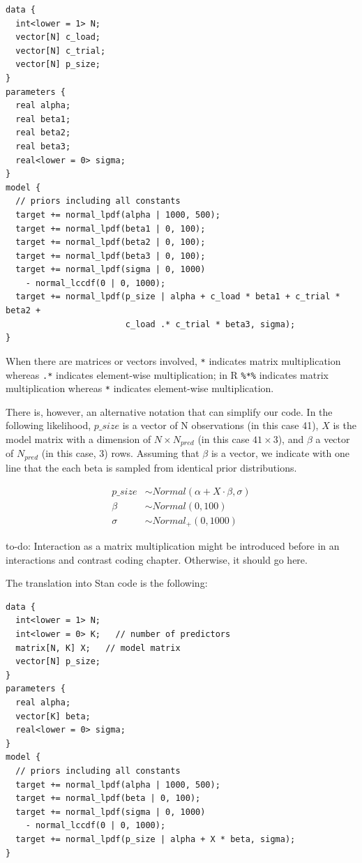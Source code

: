 \documentclass[12pt,]{krantz}
\makeatletter
\newenvironment{kframe}{%
\medskip{}
\setlength{\fboxsep}{.8em}
 \def\at@end@of@kframe{}%
 \ifinner\ifhmode%
  \def\at@end@of@kframe{\end{minipage}}%
  \begin{minipage}{\columnwidth}%
 \fi\fi%
 \def\FrameCommand##1{\hskip\@totalleftmargin \hskip-\fboxsep
 \colorbox{shadecolor}{##1}\hskip-\fboxsep
     \hskip-\linewidth \hskip-\@totalleftmargin \hskip\columnwidth}%
 \MakeFramed {\advance\hsize-\width
   \@totalleftmargin\z@ \linewidth\hsize
   \@setminipage}}%
 {\par\unskip\endMakeFramed%
 \at@end@of@kframe}
\newenvironment{rmdblock}[1]
  {
  \begin{itemize}
  \renewcommand{\labelitemi}{
    \raisebox{-.7\height}[0pt][0pt]{
      {\setkeys{Gin}{width=3em,keepaspectratio}\texttt{[image: images/\#1]}}
    }
  }
  \setlength{\fboxsep}{1em}
  \begin{kframe}
  \item
  }
  {
  \end{kframe}
  \end{itemize}
  }
\newenvironment{rmdnote}
  {\begin{rmdblock}{note}}
  {\end{rmdblock}}
\theoremstyle{definition}
\theoremstyle{definition}
\theoremstyle{definition}
\theoremstyle{remark}
\makeatother
\begin{document}
\begin{verbatim}
data {
  int<lower = 1> N;
  vector[N] c_load;
  vector[N] c_trial;
  vector[N] p_size;
}
parameters {
  real alpha;
  real beta1;
  real beta2;
  real beta3;
  real<lower = 0> sigma;
}
model {
  // priors including all constants
  target += normal_lpdf(alpha | 1000, 500);
  target += normal_lpdf(beta1 | 0, 100);
  target += normal_lpdf(beta2 | 0, 100);
  target += normal_lpdf(beta3 | 0, 100);
  target += normal_lpdf(sigma | 0, 1000)
    - normal_lccdf(0 | 0, 1000);
  target += normal_lpdf(p_size | alpha + c_load * beta1 + c_trial * beta2 +
                        c_load .* c_trial * beta3, sigma);
}
\end{verbatim}

When there are matrices or vectors involved, \texttt{*} indicates matrix
multiplication whereas \texttt{.*} indicates element-wise
multiplication; in R \texttt{\%*\%} indicates matrix multiplication
whereas \texttt{*} indicates element-wise multiplication.

There is, however, an alternative notation that can simplify our code.
In the following likelihood, \(p\_size\) is a vector of N observations
(in this case 41), \(X\) is the model matrix with a dimension of
\(N \times N_{pred}\) (in this case \(41 \times 3\)), and \(\beta\) a
vector of \(N_{pred}\) (in this case, 3) rows. Assuming that \(\beta\)
is a vector, we indicate with one line that the each beta is sampled
from identical prior distributions.

\begin{equation}
\begin{aligned}
p\_size &\sim Normal(\alpha + X \cdot \beta,\sigma)\\
\beta &\sim Normal(0, 100) \\
\sigma &\sim Normal_+(0, 1000)
\end{aligned}
\end{equation}

\begin{rmdnote} to-do: Interaction as a matrix multiplication
might be introduced before in an interactions and contrast coding
chapter. Otherwise, it should go here. \end{rmdnote}

The translation into Stan code is the following:

\begin{verbatim}
data {
  int<lower = 1> N;
  int<lower = 0> K;   // number of predictors
  matrix[N, K] X;   // model matrix
  vector[N] p_size;
}
parameters {
  real alpha;
  vector[K] beta;
  real<lower = 0> sigma;
}
model {
  // priors including all constants
  target += normal_lpdf(alpha | 1000, 500);
  target += normal_lpdf(beta | 0, 100);
  target += normal_lpdf(sigma | 0, 1000)
    - normal_lccdf(0 | 0, 1000);
  target += normal_lpdf(p_size | alpha + X * beta, sigma);
}
\end{verbatim}
\end{document}
